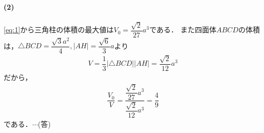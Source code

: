 \documentclass[../../main.tex]{subfiles}
\begin{document}
\paragraph{(2)}
\cref{eq:1}から三角柱の体積の最大値は$V_0=\dfrac{\sqrt{2}}{27}a^3$である．
また四面体$ABCD$の体積は，$\triangle BCD=\dfrac{\sqrt{3}a^2}{4}, |AH|=\dfrac{\sqrt{6}}{3}a$より
\begin{align}
  V
  =\dfrac{1}{3}|\triangle BCD||AH|
  =\dfrac{\sqrt{2}}{12}a^3
\end{align}
だから，
\begin{align}
  \dfrac{V_0}{V}=\dfrac{\dfrac{\sqrt{2}}{27}a^3}{\dfrac{\sqrt{2}}{12}a^3}=\dfrac{4}{9}
\end{align}
である．$\cdots$(答)
\newpage
\end{document}
